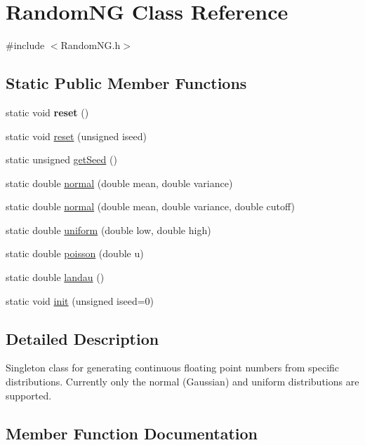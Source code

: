 \hypertarget{classRandomNG}{}\section{Random\+NG Class Reference}
\label{classRandomNG}


{\ttfamily \#include $<$Random\+N\+G.\+h$>$}

\subsection*{Static Public Member Functions}
\begin{DoxyCompactItemize}
\item 
\mbox{\label{classRandomNG_a0fd778fd76e386b5aab43c5e353a2dfb}} 
static void {\bfseries reset} ()
\item 
static void \hyperlink{classRandomNG_a20d6021c831b68ac579b5d812bbbad9d}{reset} (unsigned iseed)
\item 
static unsigned \hyperlink{classRandomNG_a88efd3a5dfc5fa283d73687f52d351c7}{get\+Seed} ()
\item 
static double \hyperlink{classRandomNG_a94cd0fbe15525846e3d4646f2934eee9}{normal} (double mean, double variance)
\item 
static double \hyperlink{classRandomNG_a97273e66717ff62b3ed07d6f7b98e05a}{normal} (double mean, double variance, double cutoff)
\item 
static double \hyperlink{classRandomNG_a1590a28c391a32b94911ab14648a6a31}{uniform} (double low, double high)
\item 
static double \hyperlink{classRandomNG_a8a27bb986aca792cb4ca652125cd9676}{poisson} (double u)
\item 
static double \hyperlink{classRandomNG_acc4327088b8d7b96d9f6718fa584aa8b}{landau} ()
\item 
static void \hyperlink{classRandomNG_acaabcd3fa0e8e8fc73d4065cecbefd8a}{init} (unsigned iseed=0)
\end{DoxyCompactItemize}


\subsection{Detailed Description}
Singleton class for generating continuous floating point numbers from specific distributions. Currently only the normal (Gaussian) and uniform distributions are supported. 

\subsection{Member Function Documentation}
\mbox{\label{classRandomNG_a88efd3a5dfc5fa283d73687f52d351c7}} 
